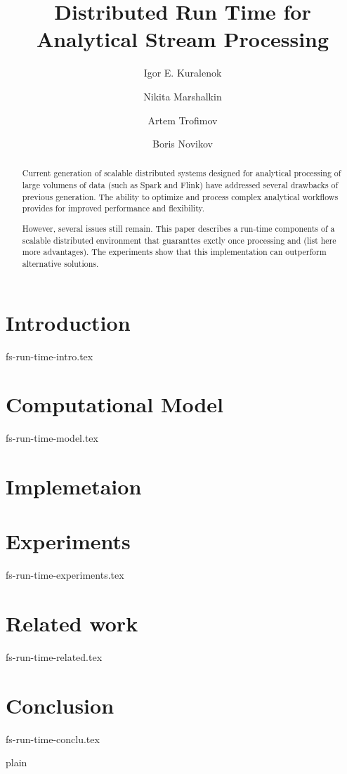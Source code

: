 \documentclass {article}
\begin{document}
\title {Distributed Run Time for Analytical Stream Processing}
\author {Igor E. Kuralenok \and Nikita Marshalkin \and Artem Trofimov \and Boris Novikov}
\maketitle

\begin{abstract}
Current generation of scalable distributed systems designed for analytical processing of large volumens of data (such as  Spark and Flink) have addressed several drawbacks of previous generation. The ability to optimize and process complex analytical workflows  provides for improved performance and flexibility.

However, several issues still remain. This paper describes a run-time components of a scalable distributed environment that guaranttes exctly once  processing and (list here more advantages). The experiments show that this implementation can outperform alternative solutions.
\end {abstract}

\section {Introduction}
 {fs-run-time-intro.tex}

\section {Computational Model}
 {fs-run-time-model.tex}

\section {Implemetaion}


\section {Experiments}
 {fs-run-time-experiments.tex}

\section {Related work}
 {fs-run-time-related.tex}

\section {Conclusion}
 {fs-run-time-conclu.tex}

 {plain}

\end{document}
